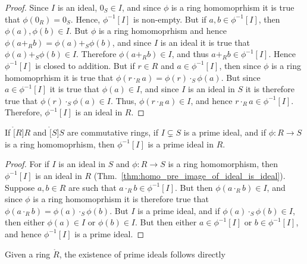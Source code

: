 \documentclass{article}                                                        %
\begin{document}
        \begin{proof}
            Since $I$ is an ideal, $0_{S}\in{I}$, and since $\phi$ is a ring
            homomoprhism it is true that $\phi(0_{R})=0_{S}$. Hence,
            $\phi^{\minus{1}}[I]$ is non-empty. But if
            $a,b\in\phi^{\minus{1}}[I]$, then $\phi(a),\phi(b)\in{I}$. But
            $\phi$ is a ring homomoprhism and hence
            $\phi(a+_{R}b)=\phi(a)+_{S}\phi(b)$, and since $I$ is an ideal it is
            true that $\phi(a)+_{S}\phi(b)\in{I}$. Therefore
            $\phi(a+_{R}b)\in{I}$, and thus $a+_{R}b\in\phi^{\minus{1}}[I]$.
            Hence $\phi^{\minus{1}}[I]$ is closed to addition. But if $r\in{R}$
            and $a\in\phi^{\minus{1}}[I]$, then since $\phi$ is a ring
            homomoprhism it is true that
            $\phi(r\cdot_{R}a)=\phi(r)\cdot_{S}\phi(a)$. But since
            $a\in\phi^{\minus{1}}[I]$ it is true that $\phi(a)\in{I}$, and since
            $I$ is an ideal in $S$ it is therefore true that
            $\phi(r)\cdot_{S}\phi(a)\in{I}$. Thus, $\phi(r\cdot_{R}a)\in{I}$,
            and hence $r\cdot_{R}a\in\phi^{\minus{1}}[I]$. Therefore,
            $\phi^{\minus{1}}[I]$ is an ideal in $R$.
        \end{proof}
        \begin{theorem}
            If $\ring[R]{R}$ and $\ring[S]{S}$ are commutative rings, if
            $I\subsetneq{S}$ is a prime ideal, and if $\phi:R\rightarrow{S}$ is
            a ring homomoprhism, then $\phi^{\minus{1}}[I]$ is a prime ideal in
            $R$.
        \end{theorem}
        \begin{proof}
            For if $I$ is an ideal in $S$ and $\phi:R\rightarrow{S}$ is a ring
            homomorphism, then $\phi^{\minus{1}}[I]$ is an ideal in $R$
            (Thm.~\ref{thm:homo_pre_image_of_ideal_is_ideal}). Suppose
            $a,b\in{R}$ are such that $a\cdot_{R}b\in\phi^{\minus{1}}[I]$.
            But then $\phi(a\cdot_{R}b)\in{I}$, and since $\phi$ is a ring
            homomoprhism it is therefore true that
            $\phi(a\cdot_{R}b)=\phi(a)\cdot_{S}\phi(b)$. But $I$ is a prime
            ideal, and if $\phi(a)\cdot_{S}\phi(b)\in{I}$, then either
            $\phi(a)\in{I}$ or $\phi(b)\in{I}$. But then either
            $a\in\phi^{\minus{1}}[I]$ or $b\in\phi^{\minus{1}}[I]$, and hence
            $\phi^{\minus{1}}[I]$ is a prime ideal.
        \end{proof}
        Given a ring $\ring{R}$, the existence of prime ideals follows directly
\end{document}
